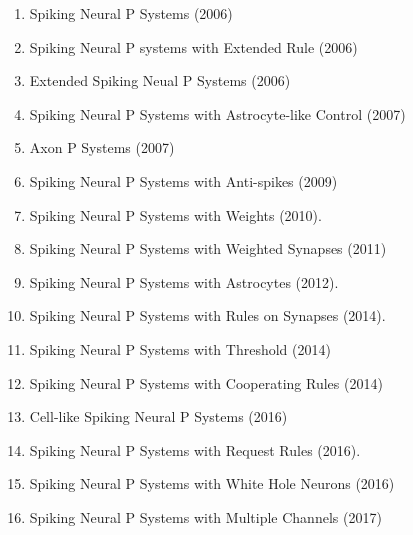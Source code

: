 \documentclass[a4paper]{article}
\begin{document}
\begin{enumerate}

\item Spiking Neural P Systems (2006)
\cite{ionescu-2006-snp}

\item Spiking Neural P systems with Extended Rule (2006)
\cite{chen-2008-snp-e}

\item Extended Spiking Neual P Systems (2006)
\cite{alhazov-2006-esnp}

\item Spiking Neural P Systems with Astrocyte-like Control (2007)
\cite{paun-2007-astrocyte-like}

\item Axon P Systems (2007)
\cite{chen-2007-axon-p}

\item Spiking Neural P Systems with Anti-spikes (2009)
\cite{pan-2009-anti-spikes}

\item Spiking Neural P Systems with Weights (2010).
\cite{wang-2010-weights}

\item Spiking Neural P Systems with Weighted Synapses (2011)
\cite{pan-2012-weighted-synapses}

\item Spiking Neural P Systems with Astrocytes (2012).
\cite{pan-2012-astrocytes}

\item Spiking Neural P Systems with Rules on Synapses (2014).
\cite{song-2014-rules-on-synapses}

\item Spiking Neural P Systems with Threshold (2014)
\cite{zeng-2014-thresholds}

\item Spiking Neural P Systems with Cooperating Rules (2014)
\cite{metta-2014-cooperating-rules}

\item Cell-like Spiking Neural P Systems (2016)
\cite{wu-2016-cell-like}

\item Spiking Neural P Systems with Request Rules (2016).
\cite{song-2016-request-rules}

\item Spiking Neural P Systems with White Hole Neurons (2016)
\cite{song-2016-white-hole-neurons}

\item Spiking Neural P Systems with Multiple Channels (2017)
\cite{peng-2017-multiple-channels}


\end{enumerate}
\end{document}
